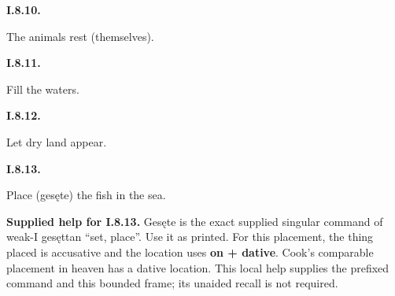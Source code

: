 \par\begin{minipage}{\linewidth}\raggedright
\textbf{I.8.10.}

The animals rest (themselves).

\end{minipage}\par\addvspace{4pt}

\par\begin{minipage}{\linewidth}\raggedright
\textbf{I.8.11.}

Fill the waters.

\end{minipage}\par\addvspace{4pt}

\par\begin{minipage}{\linewidth}\raggedright
\textbf{I.8.12.}

Let dry land appear.

\end{minipage}\par\addvspace{4pt}

\par\begin{minipage}{\linewidth}\raggedright
\textbf{I.8.13.}

Place (gesęte) the fish in the sea.

\end{minipage}\par\addvspace{4pt}

\textbf{Supplied help for I.8.13.} Gesęte is the exact supplied singular command of weak-I gesęttan “set, place”. Use it as printed. For this placement, the thing placed is accusative and the location uses \textbf{on + dative}. Cook’s comparable placement in heaven has a dative location. This local help supplies the prefixed command and this bounded frame; its unaided recall is not required.


